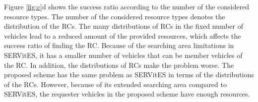 \documentclass[sensors,article,accept,moreauthors,pdftex]{Definitions/mdpi}
\begin{document}
Figure \ref{fig:c}d shows the success ratio according to the number of the considered resource types.
The number of the considered resource types denotes the distribution of the RCs.
The many distributions of RCs in the fixed number of vehicles lead to a reduced amount of the provided resources, which affects the success ratio of finding the RC.
Because of the searching area limitations in SERVitES, it has a smaller number of vehicles that can be member vehicles of the RC.
In addition, the distributions of RCs make the problem worse.
The proposed scheme has the same problem as SERVitES in terms of the distributions of the RCs.
However, because of its extended searching area compared to SERVitES, the requester vehicles in the proposed scheme have enough resources.

\end{document}
